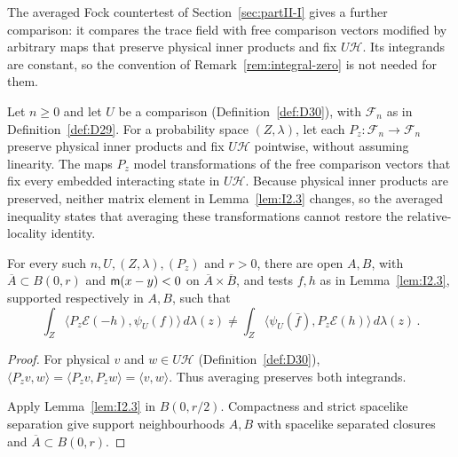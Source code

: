 The averaged Fock countertest of Section~\ref{sec:partII-I} gives a further comparison: it compares the trace field with free comparison vectors modified by arbitrary maps that preserve physical inner products and fix $U\mathcal H$. Its integrands are constant, so the convention of Remark~\ref{rem:integral-zero} is not needed for them.

Let $n\ge0$ and let $U$ be a comparison (Definition~\ref{def:D30}), with $\mathcal F_n$ as in Definition~\ref{def:D29}. For a probability space $(Z,\lambda)$, let each $P_z:\mathcal F_n\to\mathcal F_n$ preserve physical inner products and fix $U\mathcal H$ pointwise, without assuming linearity.
The maps $P_z$ model transformations of the free comparison vectors that fix every embedded interacting state in $U\mathcal H$. Because physical inner products are preserved, neither matrix element in Lemma~\ref{lem:I2.3} changes, so the averaged inequality states that averaging these transformations cannot restore the relative-locality identity.
\begin{lemma}\label{lem:I2.4}
For every such $n,U,(Z,\lambda),(P_z)$ and $r>0$, there are open $A,B$, with $\overline A\subset B(0,r)$ and $\mathsf{m}(x-y)<0$ on $\overline A\times\overline B$, and tests $f,h$ as in Lemma~\ref{lem:I2.3}, supported respectively in $A,B$, such that
\begin{equation*}
\int_Z\langle P_z\mathcal E(-h),\psi_U(f)\rangle\,d\lambda(z)
\ne\int_Z\langle\psi_U(\bar f),P_z\mathcal E(h)\rangle\,d\lambda(z)\,.
\end{equation*}
\end{lemma}
\begin{proof}
For physical $v$ and $w\in U\mathcal H$ (Definition~\ref{def:D30}), $\langle P_zv,w\rangle=\langle P_zv,P_zw\rangle=\langle v,w\rangle$.
Thus averaging preserves both integrands.

Apply Lemma~\ref{lem:I2.3} in $B(0,r/2)$. Compactness and strict spacelike separation give support neighbourhoods $A,B$ with spacelike separated closures and $\overline A\subset B(0,r)$.
\end{proof}
